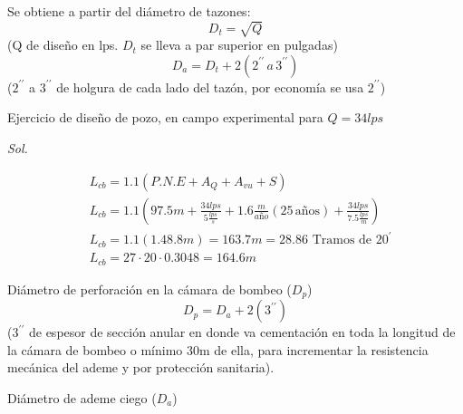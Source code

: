 Se obtiene a partir del diámetro de tazones:
\begin{equation}
    D_t = \sqrt{Q}
\end{equation}
(Q de diseño en lps. $D_t$  se lleva a par superior en pulgadas)
\begin{equation}
    D_a = D_t + 2\left(2^{\prime\prime}\, a\, 3^{\prime\prime}\right)
\end{equation}
($2^{\prime\prime}$ a $3^{\prime\prime}$ de holgura de cada lado del tazón, por economía se usa $2^{\prime\prime}$)
\begin{example}
    Ejercicio de diseño de pozo, en campo experimental para $Q=34lps$
    
    \textit{ Sol. }

    \begin{align*}
        &L_{cb} = 1.1\left(P.N.E + A_Q + A_{vu} + S\right)\\
        &L_{cb} = 1.1\left( 97.5m + \frac{34 lps}{5 \frac{lps}{s}} + 1.6\frac{m}{año} \left(25\, \text{años}\right) + \frac{34 lps}{7.5 \frac{lps}{m}}    \right)\\
        &L_{cb} = 1.1 (1.48.8m) = 163.7m = 28.86 \text{ Tramos de } 20^{\prime}\\
        &L_{cb} = 27 \cdot 20 \cdot 0.3048 = 164.6m
    \end{align*}
\end{example}
Diámetro de perforación en la cámara de bombeo ($D_p$)
\begin{equation}
    D_p = D_a + 2\left(3^{\prime\prime}\right)
\end{equation}
($3^{\prime\prime}$ de espesor de sección anular en donde va cementación en toda la longitud de la cámara de bombeo o mínimo 30m de ella, para incrementar la resistencia mecánica del ademe y por protección sanitaria).

Diámetro de ademe ciego ($D_a$)

